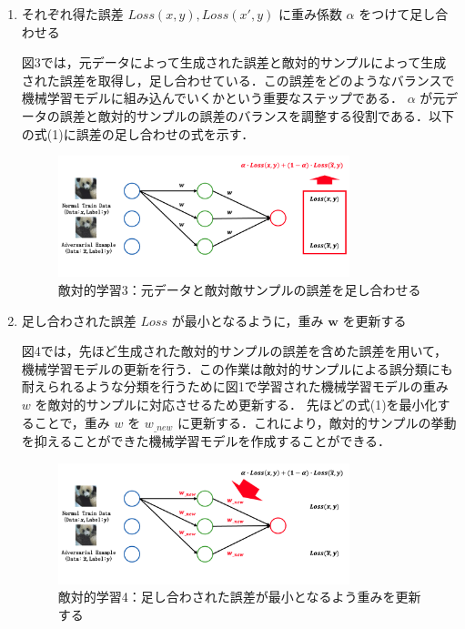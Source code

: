 \begin{enumerate}
    \item それぞれ得た誤差 $Loss(x, y), Loss(x', y)$ に重み係数 $\alpha$ をつけて足し合わせる

    図3では，元データによって生成された誤差と敵対的サンプルによって生成された誤差を取得し，足し合わせている．この誤差をどのようなバランスで機械学習モデルに組み込んでいくかという重要なステップである． $\alpha$ が元データの誤差と敵対的サンプルの誤差のバランスを調整する役割である．以下の式(1)に誤差の足し合わせの式を示す．
    \begin{figure}[H]
        \centering
        \includegraphics[width=0.8\textwidth]{images/敵対的学習3.png}
        \caption{敵対的学習3：元データと敵対敵サンプルの誤差を足し合わせる}
        \label{fig:adversarial_learning3}
    \end{figure}

    \item 足し合わされた誤差 $Loss$ が最小となるように，重み $\bm{w}$ を更新する

    図4では，先ほど生成された敵対的サンプルの誤差を含めた誤差を用いて，機械学習モデルの更新を行う．この作業は敵対的サンプルによる誤分類にも耐えられるような分類を行うために図1で学習された機械学習モデルの重み $w$ を敵対的サンプルに対応させるため更新する．
    先ほどの式(1)を最小化することで，重み $w$ を $w_{\_new}$ に更新する．これにより，敵対的サンプルの挙動を抑えることができた機械学習モデルを作成することができる．
    
    \begin{figure}[H]
        \centering
        \includegraphics[width=0.8\textwidth]{images/敵対的学習4.png}
        \caption{敵対的学習4：足し合わされた誤差が最小となるよう重みを更新する}
        \label{fig:adversarial_learning4}
    \end{figure}

\end{enumerate}

